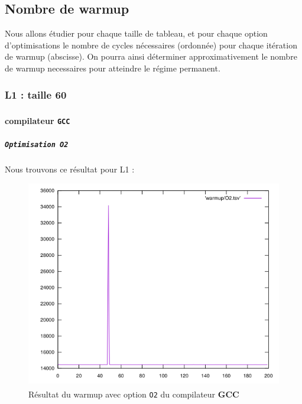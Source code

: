 \documentclass{report}
\begin{document}
    \subsection{Nombre de warmup}
    Nous allons étudier pour chaque taille de tableau, et pour chaque option d'optimisations le nombre de cycles nécessaires (ordonnée) pour chaque itération de warmup (abscisse). On pourra ainsi déterminer approximativement le nombre de warmup necessaires pour atteindre le régime permanent.
    \subsubsection{L1 : taille 60}
      \newpage
      \paragraph{compilateur \texttt{GCC\textsuperscript \textcopyleft  }}
        \subparagraph{ \texttt{Optimisation O2}}
      Nous trouvons ce résultat pour L1 :
      \begin{figure}[ht!]
        \centering
        \includegraphics[scale=0.45]{resources/L1/warmup/O2.png}
        \caption{Résultat du warmup avec option \texttt{O2} du compilateur \textbf{GCC\textsuperscript \textcopyleft  }}
      \end{figure}
\end{document}
